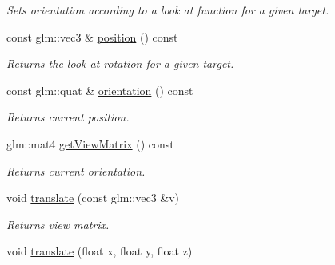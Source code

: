 \begin{DoxyCompactItemize}
\begin{DoxyCompactList}\small\item\em Sets orientation according to a look at function for a given target. \end{DoxyCompactList}\item 
\hypertarget{class_camera_a8f86421742800785e5199421ab14587f}{const glm\+::vec3 \& \hyperlink{class_camera_a8f86421742800785e5199421ab14587f}{position} () const }\label{class_camera_a8f86421742800785e5199421ab14587f}

\begin{DoxyCompactList}\small\item\em Returns the look at rotation for a given target. \end{DoxyCompactList}\item 
\hypertarget{class_camera_ade2d43712dd19520fc16d90147cb585f}{const glm\+::quat \& \hyperlink{class_camera_ade2d43712dd19520fc16d90147cb585f}{orientation} () const }\label{class_camera_ade2d43712dd19520fc16d90147cb585f}

\begin{DoxyCompactList}\small\item\em Returns current position. \end{DoxyCompactList}\item 
\hypertarget{class_camera_a941940439c3704c7e5c75e6fd9fa6e7c}{glm\+::mat4 \hyperlink{class_camera_a941940439c3704c7e5c75e6fd9fa6e7c}{get\+View\+Matrix} () const }\label{class_camera_a941940439c3704c7e5c75e6fd9fa6e7c}

\begin{DoxyCompactList}\small\item\em Returns current orientation. \end{DoxyCompactList}\item 
\hypertarget{class_camera_aa00429d00bae4984467f9c5d1a3bd158}{void \hyperlink{class_camera_aa00429d00bae4984467f9c5d1a3bd158}{translate} (const glm\+::vec3 \&v)}\label{class_camera_aa00429d00bae4984467f9c5d1a3bd158}

\begin{DoxyCompactList}\small\item\em Returns view matrix. \end{DoxyCompactList}\item 
\hypertarget{class_camera_ac9e53556c53beee69c77a97e2a1c1068}{void \hyperlink{class_camera_ac9e53556c53beee69c77a97e2a1c1068}{translate} (float x, float y, float z)}\label{class_camera_ac9e53556c53beee69c77a97e2a1c1068}


\end{DoxyCompactItemize}
